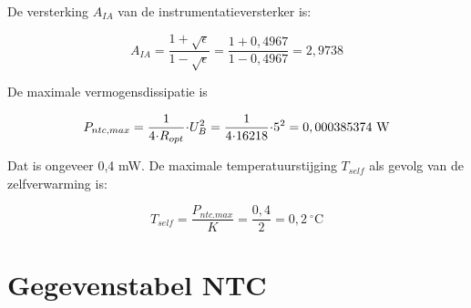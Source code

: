 \documentclass[12pt,a4paper,final,twoside,fleqn]{article}
\newcommand{\rntc}{R_\text{NTC}}
\newcommand{\ropt}{R_{opt}}
\let\oldcdot\cdot
\renewcommand{\cdot}{\kern-.10em\oldcdot\kern-.10em}
\begin{document}
De versterking $A_{IA}$ van de instrumentatieversterker is:

\begin{equation}
A_{IA} = \dfrac{1+\sqrt{\epsilon}}{1-\sqrt{\epsilon}} = 
         \dfrac{1+0,4967}{1-0,4967} = 2,9738
\end{equation}

De maximale vermogensdissipatie is

\begin{equation}
P_{ntc,max} = \dfrac{1}{4\cdot \ropt}\cdot U_B^2 = \dfrac{1}{4\cdot 16218}\cdot 5^2 =
0,000385374\ \text{W}
\end{equation}

Dat is ongeveer 0,4 mW. De maximale temperatuurstijging $T_{self}$ als gevolg van de
 zelfverwarming is:
 
\begin{equation}
T_{self} = \dfrac{P_{ntc.max}}{K} = \dfrac{0,4}{2}=0,2\ ^\circ\text{C}
\end{equation}


\appendix

\clearpage
\section{Gegevenstabel NTC}
\end{document}
